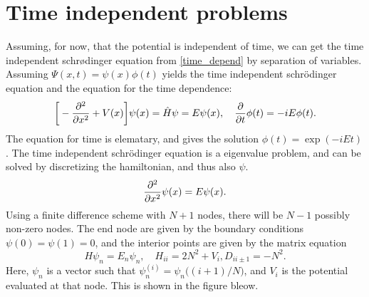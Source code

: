 \documentclass{article}
\begin{document}
\section*{Time independent problems}
    Assuming, for now, that the potential is independent of time, we can get the time independent schrødinger equation from \eqref{time_depend} by separation of variables. Assuming $\Psi(x, t) = \psi(x)\phi(t)$  yields the time independent schrödinger equation and the equation for the time dependence:
    \begin{equation}
        \bigg[-\pdv[2]{x} + V(x) \bigg] \psi(x) = \hat H \psi = E \psi(x), \quad \pdv{t}\phi(t) = -iE\phi(t).
        \label{TUSL}
    \end{equation}
    The equation for time is elematary, and gives the solution $\phi(t) = \exp(-iEt)$. The time independent schrödinger equation is a eigenvalue problem, and can be solved by discretizing the hamiltonian, and thus also $\psi$. 
    \begin{equation*}
        \pdv[2]{x}\psi(x) = E \psi(x).
    \end{equation*}
    Using a finite difference scheme with $N + 1$ nodes, there will be $N-1$ possibly non-zero nodes. The end node are given by the boundary conditions $\psi(0) = \psi(1) = 0$, and the interior points are given by the matrix equation
    \begin{equation*}
        H \psi_n = E_n \psi_n, \quad H_{ii} = 2N^2 + V_i, D_{ii\pm1} = -N^2.
    \end{equation*}
    Here, $\psi_n$ is a vector such that $\psi_n^{(i)} = \psi_n\big((i+1)/N\big)$, and $V_i$ is the potential evaluated at that node. This is shown in the figure bleow.

    \begin{center}
    \end{center}
\end{document}
